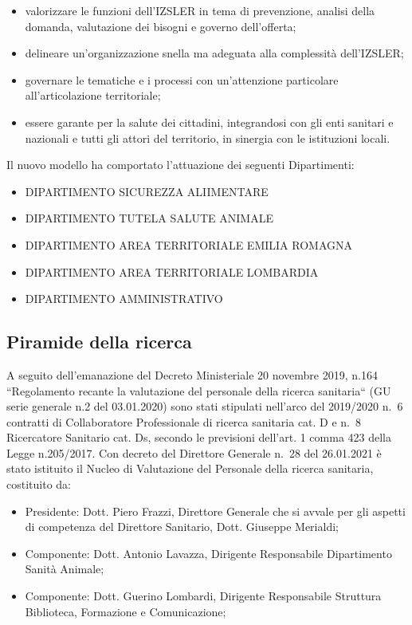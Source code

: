 \documentclass[
  12pt,
]{article}
\providecommand{\tightlist}{%
  \setlength{\itemsep}{0pt}\setlength{\parskip}{0pt}}
\begin{document}
\begin{itemize}
\tightlist
\item
  valorizzare le funzioni dell'IZSLER in tema di prevenzione, analisi
  della domanda, valutazione dei bisogni e governo dell'offerta;
\item
  delineare un'organizzazione snella ma adeguata alla complessità
  dell'IZSLER;
\item
  governare le tematiche e i processi con un'attenzione particolare
  all'articolazione territoriale;
\item
  essere garante per la salute dei cittadini, integrandosi con gli enti
  sanitari e nazionali e tutti gli attori del territorio, in sinergia
  con le istituzioni locali.
\end{itemize}

Il nuovo modello ha comportato l'attuazione dei seguenti Dipartimenti:

\begin{itemize}
\tightlist
\item
  DIPARTIMENTO SICUREZZA ALIIMENTARE
\item
  DIPARTIMENTO TUTELA SALUTE ANIMALE
\item
  DIPARTIMENTO AREA TERRITORIALE EMILIA ROMAGNA
\item
  DIPARTIMENTO AREA TERRITORIALE LOMBARDIA
\item
  DIPARTIMENTO AMMINISTRATIVO
\end{itemize}

\hypertarget{piramide-della-ricerca}{%
\subsection{Piramide della ricerca}\label{piramide-della-ricerca}}

A seguito dell'emanazione del Decreto Ministeriale 20 novembre 2019,
n.164 ``Regolamento recante la valutazione del personale della ricerca
sanitaria`` (GU serie generale n.2 del 03.01.2020) sono stati stipulati
nell'arco del 2019/2020 n.~6 contratti di Collaboratore Professionale di
ricerca sanitaria cat. D e n.~8 Ricercatore Sanitario cat. Ds, secondo
le previsioni dell'art. 1 comma 423 della Legge n.205/2017. Con decreto
del Direttore Generale n.~28 del 26.01.2021 è stato istituito il Nucleo
di Valutazione del Personale della ricerca sanitaria, costituito da:

\begin{itemize}
\tightlist
\item
  Presidente: Dott. Piero Frazzi, Direttore Generale che si avvale per
  gli aspetti di competenza del Direttore Sanitario, Dott. Giuseppe
  Merialdi;
\item
  Componente: Dott. Antonio Lavazza, Dirigente Responsabile Dipartimento
  Sanità Animale;
\item
  Componente: Dott. Guerino Lombardi, Dirigente Responsabile Struttura
  Biblioteca, Formazione e Comunicazione;
\end{itemize}
\end{document}
